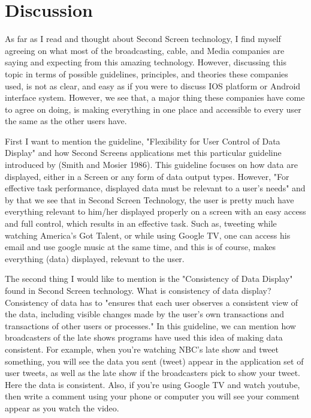 \documentclass[12pt, oneside]{amsart}   	%
\begin{document}
 \section{Discussion}
  As far as I read and thought about Second Screen technology, I find myself agreeing on what most of the broadcasting, cable, and Media companies are saying and expecting from this amazing technology.  However, discussing this topic in terms of possible guidelines, principles, and theories these companies used, is not as clear, and easy as if you were to discuss IOS platform or Android interface system.  However, we see that, a major thing these companies have come to agree on doing, is making everything in one place and accessible to every user the same as the other users have.

 First I want to mention the guideline, "Flexibility for User Control of Data Display" and how Second Screens applications met this particular guideline introduced by (Smith and Mosier 1986).  This guideline focuses on how data are displayed, either in a Screen or any form of data output types.  However, "For effective task performance, displayed data must be relevant to a user's needs"\cite{Guideline} and by that we see that in Second Screen Technology, the user is pretty much have everything relevant to him/her displayed properly on a screen with an easy access and full control, which results in an effective task.  Such as, tweeting while watching America's Got Talent, or while using Google TV, one can access his email and use google music at the same time, and this is of course, makes everything (data) displayed, relevant to the user. 

 The second thing I would like to mention is the "Consistency of Data Display" found in Second Screen technology.  What is consistency of data display?   Consistency of data has to "ensures that each user observes a consistent view of the data, including visible changes made by the user's own transactions and transactions of other users or processes."\cite{guidline2} In this guideline, we can mention how broadcasters of the late shows programs have used this idea of making data consistent.  For example, when you're watching NBC's late show and tweet something, you will see the data you sent (tweet) appear in the application set of user tweets, as well as the late show if the broadcasters pick to show your tweet.  Here the data is consistent.  Also, if you're using Google TV and watch youtube, then write a comment using your phone or computer you will see your comment appear as you watch the video.
\end{document}
